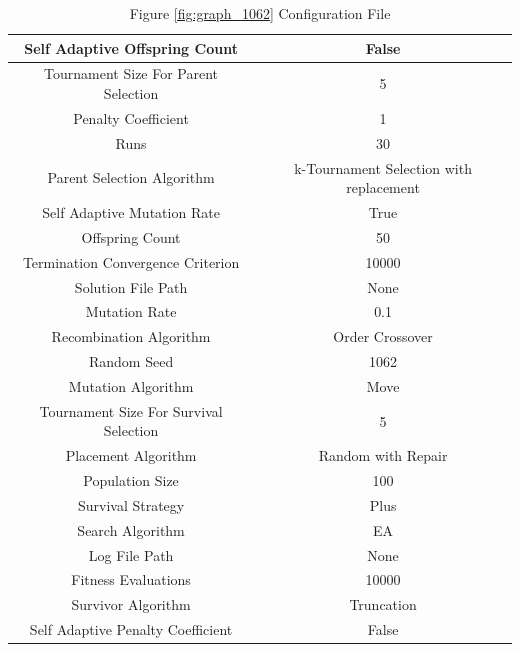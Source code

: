 \documentclass{standalone}
\begin{document}
\begin{table}[!htb]
	\centering
	\caption{Figure \ref{fig:graph_1062} Configuration File}
	\label{tab:graph_1062}
	\begin{tabular}{| c | c |}
		\hline
		Self Adaptive Offspring Count		& False		 \\
		\hline
		Tournament Size For Parent Selection		& 5		 \\
		\hline
		Penalty Coefficient		& 1		 \\
		\hline
		Runs		& 30		 \\
		\hline
		Parent Selection Algorithm		& k-Tournament Selection with replacement		 \\
		\hline
		Self Adaptive Mutation Rate		& True		 \\
		\hline
		Offspring Count		& 50		 \\
		\hline
		Termination Convergence Criterion		& 10000		 \\
		\hline
		Solution File Path		& None		 \\
		\hline
		Mutation Rate		& 0.1		 \\
		\hline
		Recombination Algorithm		& Order Crossover		 \\
		\hline
		Random Seed		& 1062		 \\
		\hline
		Mutation Algorithm		& Move		 \\
		\hline
		Tournament Size For Survival Selection		& 5		 \\
		\hline
		Placement Algorithm		& Random with Repair		 \\
		\hline
		Population Size		& 100		 \\
		\hline
		Survival Strategy		& Plus		 \\
		\hline
		Search Algorithm		& EA		 \\
		\hline
		Log File Path		& None		 \\
		\hline
		Fitness Evaluations		& 10000		 \\
		\hline
		Survivor Algorithm		& Truncation		 \\
		\hline
		Self Adaptive Penalty Coefficient		& False		 \\
		\hline
	\end{tabular}
\end{table}
\end{document}
